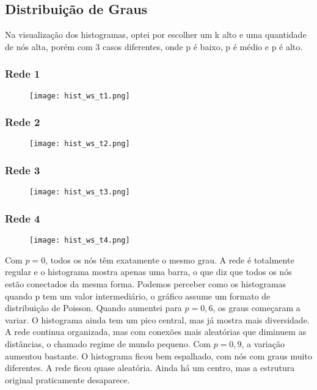 \documentclass[a4paper]{article}
\begin{document}
\newpage

\subsection*{Distribuição de Graus}

Na visualização dos histogramas, optei por escolher um k alto e uma quantidade de nós alta, porém com 3 casos diferentes, onde p é baixo, p é médio e p é alto.

\subsubsection{Rede 1}

\begin{figure}[h]
\centering
\texttt{[image: hist\_ws\_t1.png]}
\end{figure}

\subsubsection{Rede 2}

\begin{figure}[h]
\centering
\texttt{[image: hist\_ws\_t2.png]}
\end{figure}

\newpage

\subsubsection{Rede 3}

\begin{figure}[h]
\centering
\texttt{[image: hist\_ws\_t3.png]}
\end{figure}

\subsubsection{Rede 4}

\begin{figure}[h]
\centering
\texttt{[image: hist\_ws\_t4.png]}
\end{figure}
Com $p = 0$, todos os nós têm exatamente o mesmo grau. A rede é totalmente regular e o histograma mostra apenas uma barra, o que diz que todos os nós estão conectados da mesma forma.
Podemos perceber como os histogramas quando p tem um valor intermediário, o gráfico assume um formato de distribuição de Poisson.
Quando aumentei para $p = 0{,}6$, os graus começaram a variar. O histograma ainda tem um pico central, mas já mostra mais diversidade. A rede continua organizada, mas com conexões mais aleatórias que diminuem as distâncias, o chamado regime de mundo pequeno.
Com $p = 0{,}9$, a variação aumentou bastante. O histograma ficou bem espalhado, com nós com graus muito diferentes. A rede ficou quase aleatória. Ainda há um centro, mas a estrutura original praticamente desaparece.
\end{document}
